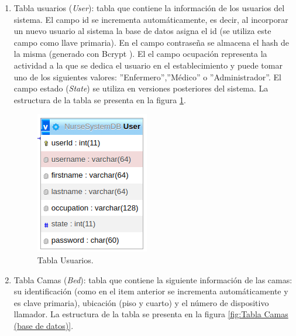 \begin{enumerate}

\item Tabla usuarios (\textit{User}): tabla que contiene la información de los usuarios del sistema. El campo id se incrementa automáticamente, es decir, al incorporar un nuevo usuario al sistema la base de datos asigna el id (se utiliza este campo como llave primaria). En el campo contraseña se almacena el hash de la misma (generado con Bcrypt \citep{WEBSITE:31}). El el campo ocupación representa la actividad a la que se dedica el usuario en el establecimiento y puede tomar uno de los siguientes valores: ''Enfermero'',''Médico'' o ''Administrador''. El campo estado (\textit{State}) se utiliza en versiones posteriores del sistema. La estructura de la tabla se presenta en la figura \ref{fig:Tabla Usuarios (base de datos)}.

\begin{figure}[ht]
	\centering
	\includegraphics[scale=.70]{./Figures/dB(user).png}
	\caption{Tabla Usuarios.}
	\label{fig:Tabla Usuarios (base de datos)}
\end{figure}

\item Tabla Camas (\textit{Bed}): tabla que contiene la siguiente información de las camas: su identificación (como en el item anterior se incrementa automáticamente y es clave primaria), ubicación (piso y cuarto) y el número de dispositivo llamador. La estructura de la tabla se presenta en la figura \ref{fig:Tabla Camas (base de datos)}.


\end{enumerate}
